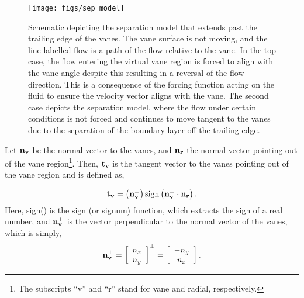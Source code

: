 \begin{figure}[!htb]
  \begin{center}
    \texttt{[image: figs/sep\_model]}
    \caption{Schematic depicting the separation model that extends past
   the trailing edge of the vanes. The vane surface is not moving, and 
   the line labelled flow is a path of the flow relative to the vane. 
   In the top case, the flow entering
   the virtual vane region is forced to align with the vane angle despite
   this resulting in a reversal of the flow direction. This is a
   consequence of the forcing function acting on the fluid to ensure the
   velocity vector aligns with the vane. 
   The second case depicts the separation
   model, where the flow under certain conditions is not forced and
   continues to move tangent to the vanes due to 
   the separation of the boundary layer off the trailing edge.} 
    \label{fig:sep_model}
  \end{center}
\end{figure}

Let $\bf n_v$ be the normal vector to the vanes,
and $\bf n_r$ the normal vector pointing out of the vane
region\footnote{\normalsize The subscripts ``v'' and ``r'' stand for
vane and radial, respectively.}.  
Then, $\bf t_v$ is the tangent vector to the vanes pointing out of
the vane region and is defined as,

\begin{equation}
 \bf t_v = \left( {\bf n_v^{\perp}} \right) \text{sign}\left(
	    {\bf n_v^{\perp}} \cdot {\bf n_r} \right).
\end{equation}
Here, sign() is the sign (or signum) function, which extracts the 
sign of a real number, and ${\bf n_v^{\perp}}$ is the vector 
perpendicular to the normal vector of the vanes, which is simply, 
\begin{equation*}
 {\bf n_v^{\perp}} = \left[ \begin{array}{c}
n_x\\
n_y\\
\end{array}\right]^{\perp} = 
 \left[ \begin{array}{c}
  -n_y\\
  n_x\\
	\end{array}\right].
\end{equation*}

